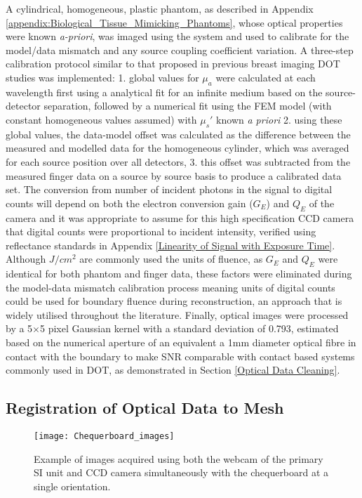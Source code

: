 \documentclass[twoside]{bhamthesis}
\theoremstyle{definition}
\begin{document}
A cylindrical, homogeneous, plastic phantom, as described in Appendix \ref{appendix:Biological_Tissue_Mimicking_Phantoms}, whose optical properties were known \textit{a-priori}, was imaged using the system and used to calibrate for the model/data mismatch and any source coupling coefficient variation. A three-step calibration protocol similar to that proposed in previous breast imaging DOT studies \cite{Dehghani2003} was implemented: 1. global values for $\mu_a$ were calculated at each wavelength first using a analytical fit for an infinite medium based on the source-detector separation, followed by a numerical fit using the FEM model (with constant homogeneous
values assumed) with $\mu_s'$ known \textit{a priori} 2. using these global values, the data-model offset was calculated as the difference between the measured and modelled data for the homogeneous cylinder, which was averaged for each source position over all detectors, 3. this offset was subtracted from the measured finger data on a source by source basis to produce a calibrated data set. The conversion from number of incident photons in the signal to digital counts will depend on both the electron conversion gain ($G_E$) and $Q_E$ of the camera and it was appropriate to assume for this high specification CCD camera that digital counts were proportional to incident intensity, verified using reflectance standards in Appendix 
\ref{Linearity of Signal with Exposure Time}. Although $J/cm^2$ are commonly used the units of fluence, as $G_E$ and $Q_E$ were identical for both phantom and finger data, these factors were eliminated during the model-data mismatch calibration process meaning units of digital counts could be used for boundary fluence during reconstruction, an approach that is widely utilised throughout the literature. Finally, optical images were processed by a 5$\times$5 pixel Gaussian kernel with a standard deviation of 0.793, estimated based on the numerical aperture of an equivalent a 1mm diameter optical fibre in contact with the boundary to make SNR comparable with contact based systems commonly used in DOT, as demonstrated in Section \ref{Optical Data Cleaning}.

\subsection{Registration of Optical Data to Mesh}

\label{Registration of Optical Data to Mesh}


\begin{figure}[!ht]
\texttt{[image: Chequerboard\_images]}
\centering
\caption{Example of images acquired using both the webcam of the primary SI unit and CCD camera simultaneously with the chequerboard at a single orientation.}
\centering
\label{fig:Chequerboard_images}
\end{figure}
\end{document}
